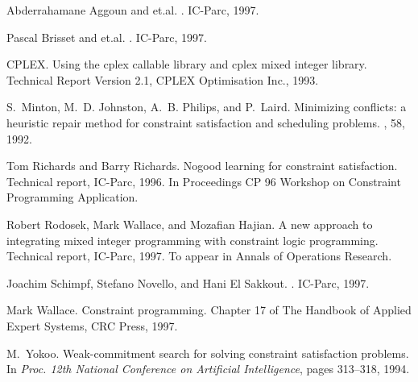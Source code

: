 \documentclass[a4wide]{article}
\begin{document}
%
%
\begin{thebibliography}{MJPL92}

Abderrahamane Aggoun and {et.al.}
.
\newblock IC-Parc, 1997.

Pascal Brisset and {et.al.}
.
\newblock IC-Parc, 1997.

CPLEX.
\newblock Using the cplex callable library and cplex mixed integer library.
\newblock Technical Report Version 2.1, CPLEX Optimisation Inc., 1993.

S.~Minton, M.~D. Johnston, A.~B. Philips, and P.~Laird.
\newblock Minimizing conflicts: a heuristic repair method for constraint
  satisfaction and scheduling problems.
, 58, 1992.

Tom Richards and Barry Richards.
\newblock Nogood learning for constraint satisfaction.
\newblock Technical report, IC-Parc, 1996.
\newblock In Proceedings CP 96 Workshop on Constraint Programming Application.

Robert Rodosek, Mark Wallace, and Mozafian Hajian.
\newblock A new approach to integrating mixed integer programming with
  constraint logic programming.
\newblock Technical report, IC-Parc, 1997.
\newblock To appear in {Annals of Operations Research}.

Joachim Schimpf, Stefano Novello, and Hani {El Sakkout}.
.
\newblock IC-Parc, 1997.

Mark Wallace.
\newblock Constraint programming.
\newblock Chapter 17 of {The Handbook of Applied Expert Systems}, CRC Press, 1997.

M.~Yokoo.
\newblock Weak-commitment search for solving constraint satisfaction problems.
\newblock In {\em Proc. 12th National Conference on Artificial Intelligence},
  pages 313--318, 1994.

\end{thebibliography}

\newpage

\tableofcontents
\end{document}
